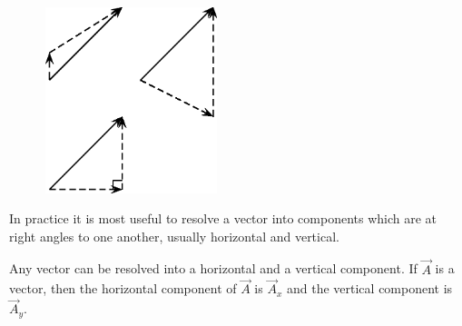     \setcounter{subfigure}{0}


	\begin{figure}[H] %
    \begin{center}
    \label{m38819*id192894!!!underscore!!!media}\label{m38819*id192894!!!underscore!!!printimage}\includegraphics[width=5cm]{col11305.imgs/m38819_PG11C1_058.png} %
        
      \vspace{2pt}
    \vspace{.1in}
    
    \end{center}

 \end{figure}   

    \addtocounter{footnote}{-0}
    
      \par 
      \label{m38819*id192901}In practice it is most useful to resolve a vector into components
which are at right angles to one another, usually horizontal and vertical.\par 
      \label{m38819*id192905}Any vector can be resolved into a horizontal and a vertical component. If \begin{math}\stackrel{\to }{A}\end{math} is a vector, then the horizontal component of \begin{math}\stackrel{\to }{A}\end{math} is \begin{math}{\stackrel{\to }{A}}_{x}\end{math} and the vertical component is \begin{math}{\stackrel{\to }{A}}_{y}\end{math}.\par 
      \label{m38819*id192983}
        
    \setcounter{subfigure}{0}


